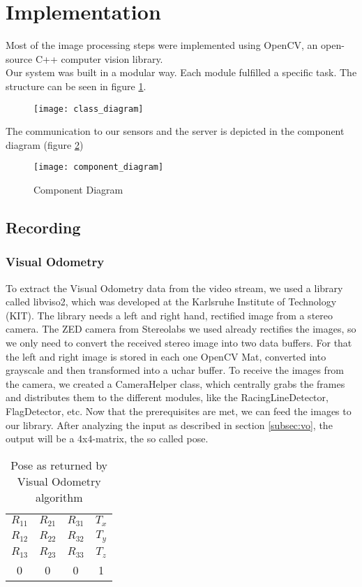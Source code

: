 \section{Implementation}
\label{sec:implementation}

Most of the image processing steps were implemented using OpenCV, an open-source C++ computer vision library.\\
Our system was built in a modular way. Each module fulfilled a specific task. The structure can be seen in figure \ref{fig:class_diagram}.

\begin{figure}[!ht]
\texttt{[image: class\_diagram]}
\label{fig:class_diagram}
\end{figure}

The communication to our sensors and the server is depicted in the component diagram (figure \ref{fig:component_diagram})

\begin{figure}[!ht]
	\texttt{[image: component\_diagram]}
	\caption{Component Diagram}
	\label{fig:component_diagram}
\end{figure}
\clearpage

\subsection{Recording}
\subsubsection{Visual Odometry}
To extract the Visual Odometry data from the video stream, we used a library called libviso2, which was developed at the Karlsruhe Institute of Technology (KIT). The library needs a left and right hand, rectified image from a stereo camera. The ZED camera from Stereolabs we used already rectifies the images, so we only need to convert the received stereo image into two data buffers.
For that the left and right image is stored in each one OpenCV Mat, converted into grayscale and then transformed into a uchar buffer.
To receive the images from the camera, we created a CameraHelper class, which centrally grabs the frames and distributes them to the different modules, like the RacingLineDetector, FlagDetector, etc.
Now that the prerequisites are met, we can feed the images to our library.
After analyzing the input as described in section \ref{subsec:vo}, the output will be a 4x4-matrix, the so called pose.

\begin{table}[!ht]
 \begin{center}
  \begin{tabular}{c c c c}
   $R_{11}$ & $R_{21}$ & $R_{31}$ & $T_{x}$\\
   $R_{12}$ & $R_{22}$ & $R_{32}$ & $T_{y}$\\
   $R_{13}$ & $R_{23}$ & $R_{33}$ & $T_{z}$\\
   0 & 0 & 0 & 1
  \end{tabular}
 \end{center}
 \caption{Pose as returned by Visual Odometry algorithm}
\end{table}

